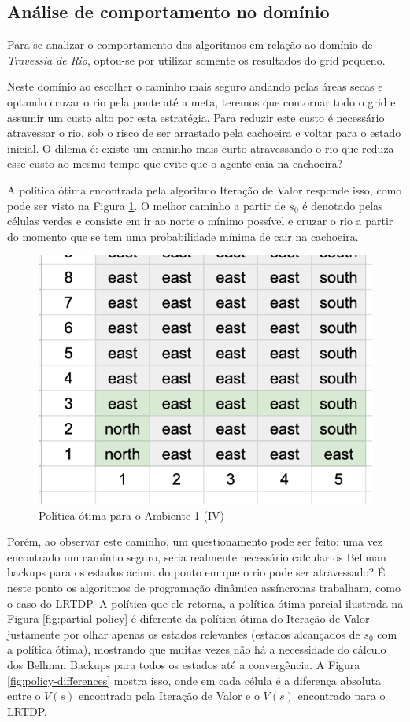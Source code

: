 \documentclass[letterpaper]{article}
\begin{document}
\subsection{Análise de comportamento no domínio}

Para se analizar o comportamento dos algoritmos em relação ao domínio de \emph{Travessia de Rio}, optou-se por utilizar somente os resultados do grid pequeno.

Neste domínio ao escolher o caminho mais seguro andando pelas áreas secas e optando cruzar o rio pela ponte até a meta, teremos que contornar todo o grid e assumir um custo alto por esta estratégia. Para reduzir este custo é necessário atravessar o rio, sob o risco de ser arrastado pela cachoeira e voltar para o estado inicial. O dilema é: existe um caminho mais curto atravessando o rio que reduza esse custo ao mesmo tempo que evite que o agente caia na cachoeira?

A política ótima encontrada pela algoritmo Iteração de Valor responde isso, como pode ser visto na Figura \ref{fig:full-policy}. O melhor caminho a partir de $s_0$ é denotado pelas células verdes e consiste em ir ao norte o mínimo possível e cruzar o rio a partir do momento que se tem uma probabilidade mínima de cair na cachoeira.

\begin{figure}[t]
    \centering
    \includegraphics[width=0.9\columnwidth]{full-policy}
    \caption{Política ótima para o Ambiente 1 (IV)}
    \label{fig:full-policy}
\end{figure}

Porém, ao observar este caminho, um questionamento pode ser feito: uma vez encontrado um caminho seguro, seria realmente necessário calcular os Bellman backups para os estados acima do ponto em que o rio pode ser atravessado?
É neste ponto os algoritmos de programação dinâmica assíncronas trabalham, como o caso do LRTDP. A política que ele retorna, a política ótima parcial ilustrada na Figura \ref{fig:partial-policy} é diferente da política ótima do Iteração de Valor justamente por olhar apenas os estados relevantes (estados alcançados de $s_0$ com a política ótima), mostrando que muitas vezes não há a necessidade do cálculo dos Bellman Backups para todos os estados até a convergência. A Figura \ref{fig:policy-differences} mostra isso, onde em cada célula é a diferença absoluta entre o $V(s)$ encontrado pela Iteração de Valor e o $V(s)$ encontrado para o LRTDP.
\end{document}
